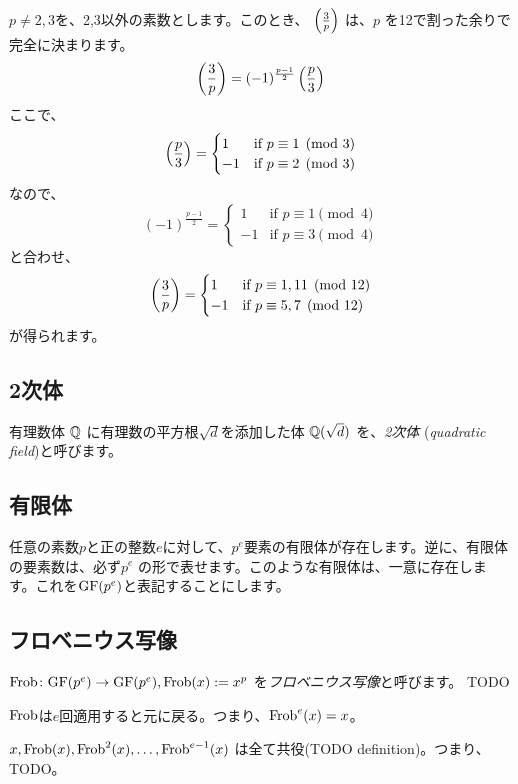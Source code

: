 \documentclass{jsarticle}
\begin{document}
  \begin{example}
   \label{ex:legendre-3}
   $p \neq 2,3$を、2,3以外の素数とします。このとき、
   $\left(\frac{3}{p}\right)$ は、$p$ を12で割った余りで完全に決まります。
   \begin{displaymath}
    \left(\frac{3}{p}\right) = (-1)^{\frac{p-1}{2}}\left(\frac{p}{3}\right)
   \end{displaymath}
   ここで、
   \begin{displaymath}
    \left(\frac{p}{3}\right) = \begin{cases}
		       1 & \mbox{if }p\equiv 1 \pmod 3 \\
		       -1 & \mbox{if }p\equiv 2 \pmod 3
		      \end{cases}
   \end{displaymath}
   なので、
   \begin{displaymath}
    (-1)^{\frac{p-1}{2}} = \begin{cases}
			    1 & \mbox{if }p \equiv 1 \pmod 4 \\
			    -1 & \mbox{if }p \equiv 3 \pmod 4
			   \end{cases}
   \end{displaymath}
   と合わせ、
   \begin{displaymath}
    \left(\frac{3}{p}\right) = \begin{cases}
		       1 & \mbox{if }p\equiv 1,11 \pmod{12} \\
		       -1 & \mbox{if }p\equiv 5,7 \pmod{12}
		      \end{cases}
   \end{displaymath}
   が得られます。
  \end{example}
  \subsection{2次体}
  \label{subsec:quadratic-field}
  有理数体 $\mathbb{Q}$ に有理数の平方根$\sqrt{d}$を添加した体 $\mathbb{Q}(\sqrt{d})$ を、\emph{2次体} (\emph{quadratic field})と呼びます。
  \subsection{有限体}
  任意の素数$p$と正の整数$e$に対して、$p^e$要素の有限体が存在します。逆に、有限体の要素数は、必ず$p^e$ の形で表せます。このような有限体は、一意に存在します。これを$\mathrm{GF}(p^e)$と表記することにします。
  \subsection{フロベニウス写像}
  $\mathrm{Frob} \colon \mathrm{GF}(p^e) \to \mathrm{GF}(p^e), \mathrm{Frob}(x) := x^p$ を\emph{フロベニウス写像}と呼びます。 TODO
  \begin{proposition}
   $\mathrm{Frob}$は$e$回適用すると元に戻る。つまり、$\mathrm{Frob}^e(x) = x$。
  \end{proposition}
  \begin{proposition}
   $x, \mathrm{Frob}(x), \mathrm{Frob}^2(x), \ldots, \mathrm{Frob}^{e-1}(x)$ は全て共役(TODO definition)。つまり、TODO。
  \end{proposition}
\end{document}
